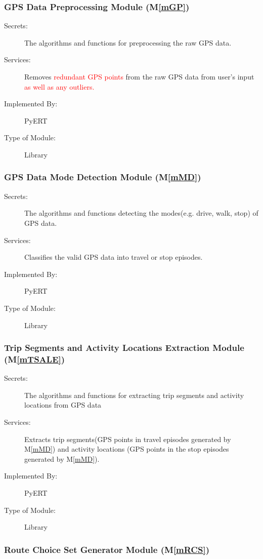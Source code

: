 \documentclass[12pt, titlepage]{article}
\newcommand{\mref}[1]{M\ref{#1}}
\begin{document}
\subsubsection{GPS Data Preprocessing Module (\mref{mGP})}

\begin{description}
\item[Secrets:]The algorithms and functions for preprocessing the raw GPS data.
\item[Services:]Removes \textcolor{red}{redundant GPS points} from the raw GPS data from user's input \textcolor{red}{as well as any outliers.}
\item[Implemented By:] PyERT
\item[Type of Module:] Library
\end{description}

\subsubsection{GPS Data Mode Detection Module (\mref{mMD})}
\begin{description}
\item[Secrets:]The algorithms and functions detecting the modes(e.g. drive, walk, stop) of GPS data.
\item[Services:]Classifies the valid GPS data into travel or stop episodes.
\item[Implemented By:] PyERT
\item[Type of Module:] Library
\end{description}

\subsubsection{Trip Segments and Activity Locations Extraction Module (\mref{mTSALE})}

\begin{description}
\item[Secrets:]The algorithms and functions for extracting trip segments and activity locations from GPS data
\item[Services:]Extracts trip segments(GPS points in travel episodes generated by \mref{mMD}) and activity locations (GPS points in the stop episodes generated by \mref{mMD}).
\item[Implemented By:] PyERT
\item[Type of Module:] Library
\end{description}

\subsubsection{Route Choice Set Generator Module (\mref{mRCS})}
\end{document}

